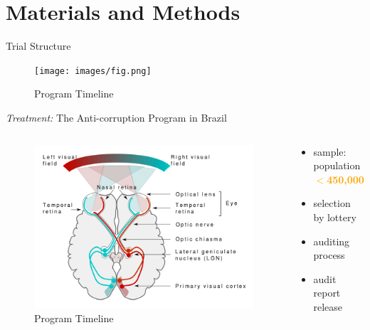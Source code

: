 \section{Materials and Methods}
    
    \frame{\sectionpage}

    \begin{frame}{Trial Structure}
        \begin{figure}\label{fig:trial_structure}
        \centering
        \texttt{[image: images/fig.png]}
        \caption{Program Timeline}
        \end{figure}
        
    \end{frame}

    \begin{frame}{\textit{Treatment:} The Anti-corruption Program in Brazil}
    
    \begin{columns}

    \begin{column}{0.5\textwidth}
        \begin{figure}\label{fig1}
        \centering
        \includegraphics[height = 0.65 \textheight]{images/fig1.png}
        \caption{Program Timeline}
        \end{figure}
    \end{column}
    
    \begin{column}{0.4\textwidth}
    
    \begin{itemize}
      	\item<2-> sample: population \textbf<3->{\textcolor<3->{orange}{$<$450,000}}
      	\item<5-> selection by lottery
      	\item<6-> auditing process
      	\item<8-> audit report release
      \end{itemize}
    

\end{column}
\end{columns}
\end{frame}
